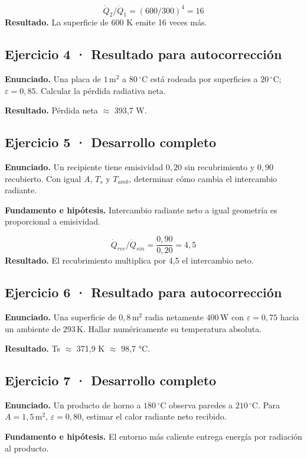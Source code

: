 \documentclass[11pt,a4paper]{article}
\begin{document}
\[
\dot Q_2/\dot Q_1=(600/300)^4=16
\]
\textbf{Resultado.} La superficie de 600 K emite 16 veces más.


\subsection*{Ejercicio 4 · Resultado para autocorrección}
\textbf{Enunciado.} Una placa de \(1\,\mathrm m^2\) a \(80\,^\circ\mathrm C\) está rodeada por superficies a \(20\,^\circ\mathrm C\); \(\varepsilon=0{,}85\). Calcular la pérdida radiativa neta.

\textbf{Resultado.} Pérdida neta \ensuremath{\approx} 393,7 W.


\subsection*{Ejercicio 5 · Desarrollo completo}
\textbf{Enunciado.} Un recipiente tiene emisividad \(0{,}20\) sin recubrimiento y \(0{,}90\) recubierto. Con igual \(A\), \(T_s\) y \(T_{amb}\), determinar cómo cambia el intercambio radiante.

\textbf{Fundamento e hipótesis.} Intercambio radiante neto a igual geometría es proporcional a emisividad.

\[
\dot Q_{rec}/\dot Q_{sin}=\frac{0{,}90}{0{,}20}=4{,}5
\]
\textbf{Resultado.} El recubrimiento multiplica por 4,5 el intercambio neto.


\subsection*{Ejercicio 6 · Resultado para autocorrección}
\textbf{Enunciado.} Una superficie de \(0{,}8\,\mathrm m^2\) radia netamente \(400\,\mathrm W\) con \(\varepsilon=0{,}75\) hacia un ambiente de \(293\,\mathrm K\). Hallar numéricamente su temperatura absoluta.

\textbf{Resultado.} Ts \ensuremath{\approx} 371,9 K \ensuremath{\approx} 98,7 °C.


\subsection*{Ejercicio 7 · Desarrollo completo}
\textbf{Enunciado.} Un producto de horno a \(180\,^\circ\mathrm C\) observa paredes a \(210\,^\circ\mathrm C\). Para \(A=1{,}5\,\mathrm m^2\), \(\varepsilon=0{,}80\), estimar el calor radiante neto recibido.

\textbf{Fundamento e hipótesis.} El entorno más caliente entrega energía por radiación al producto.
\end{document}
